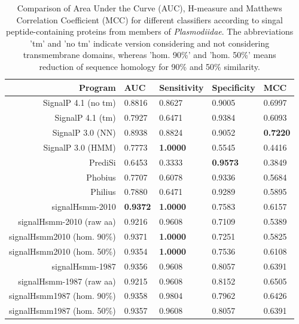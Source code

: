 \documentclass[10pt,letterpaper]{article}
\begin{document}
\begin{table}[ht]
\centering
\caption{Comparison of Area Under the Curve (AUC), H-measure and Matthews Correlation Coefficient (MCC) for different classifiers according to singal peptide-containing proteins from members of \textit{Plasmodiidae}. The abbreviations 'tm' and 'no tm' indicate version considering and not considering transmembrane domains, whereas 'hom. 90\%' and 'hom. 50\%' means reduction of sequence homology for 90\% and 50\% similarity.} 
\label{tab:bench2010plas}
\begin{tabular}{rllll}
  \toprule
Program & AUC & Sensitivity & Specificity & MCC \\ 
  \midrule
SignalP 4.1 (no tm) \cite{2011petersensignalp} & 0.8816 & 0.8627 & 0.9005 & 0.6997 \\ 
   \rowcolor[gray]{0.85}SignalP 4.1 (tm) \cite{2011petersensignalp} & 0.7927 & 0.6471 & 0.9384 & 0.6093 \\ 
  SignalP 3.0 (NN) \cite{2004bendtsenimproved} & 0.8938 & 0.8824 & 0.9052 & \textbf{0.7220} \\ 
   \rowcolor[gray]{0.85}SignalP 3.0 (HMM) \cite{2004bendtsenimproved} & 0.7773 & \textbf{1.0000} & 0.5545 & 0.4416 \\ 
  PrediSi \cite{2004hillerpredisi} & 0.6453 & 0.3333 & \textbf{0.9573} & 0.3849 \\ 
   \rowcolor[gray]{0.85}Phobius \cite{2004klla} & 0.7707 & 0.6078 & 0.9336 & 0.5684 \\ 
  Philius \cite{2008reynoldstransmembrane} & 0.7880 & 0.6471 & 0.9289 & 0.5895 \\ 
   \rowcolor[gray]{0.85}signalHsmm-2010 & \textbf{0.9372} & \textbf{1.0000} & 0.7583 & 0.6157 \\ 
  signalHsmm-2010 (raw aa) & 0.9216 & 0.9608 & 0.7109 & 0.5389 \\ 
   \rowcolor[gray]{0.85}signalHsmm2010 (hom. 90\%) & 0.9371 & \textbf{1.0000} & 0.7251 & 0.5825 \\ 
  signalHsmm2010 (hom. 50\%) & 0.9354 & \textbf{1.0000} & 0.7536 & 0.6108 \\ 
   \rowcolor[gray]{0.85}signalHsmm-1987 & 0.9356 & 0.9608 & 0.8057 & 0.6391 \\ 
  signalHsmm-1987 (raw aa) & 0.9215 & 0.9608 & 0.8152 & 0.6505 \\ 
   \rowcolor[gray]{0.85}signalHsmm1987 (hom. 90\%) & 0.9358 & 0.9804 & 0.7962 & 0.6426 \\ 
  signalHsmm1987 (hom. 50\%) & 0.9357 & 0.9608 & 0.8057 & 0.6391 \\ 
   \bottomrule
\end{tabular}
\end{table}
\end{document}
